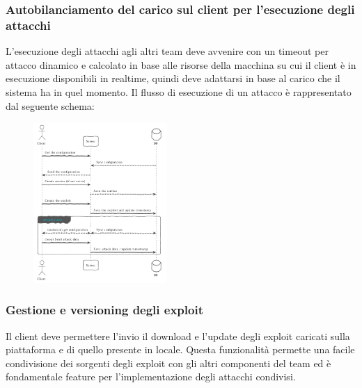 \documentclass[11pt]{article}
\begin{document}
\subsubsection{Autobilanciamento del carico sul client per l'esecuzione degli attacchi}
L'esecuzione degli attacchi agli altri team deve avvenire con un timeout per attacco dinamico e calcolato in base alle risorse della macchina su cui il client è in esecuzione disponibili in realtime, quindi deve adattarsi in base al carico che il sistema ha in quel momento.
Il flusso di esecuzione di un attacco è rappresentato dal seguente schema:
\begin{figure}[H]
	\centering
	\includegraphics[width=0.45\textwidth]{attack_sequence.png}
\end{figure}
\subsubsection{Gestione e versioning degli exploit}
Il client deve permettere l'invio il download e l'update degli exploit caricati sulla piattaforma e di quello presente in locale. Questa funzionalità permette una facile condivisione dei sorgenti degli exploit con gli altri componenti del team ed è fondamentale feature per l'implementazione degli attacchi condivisi.
\end{document}
